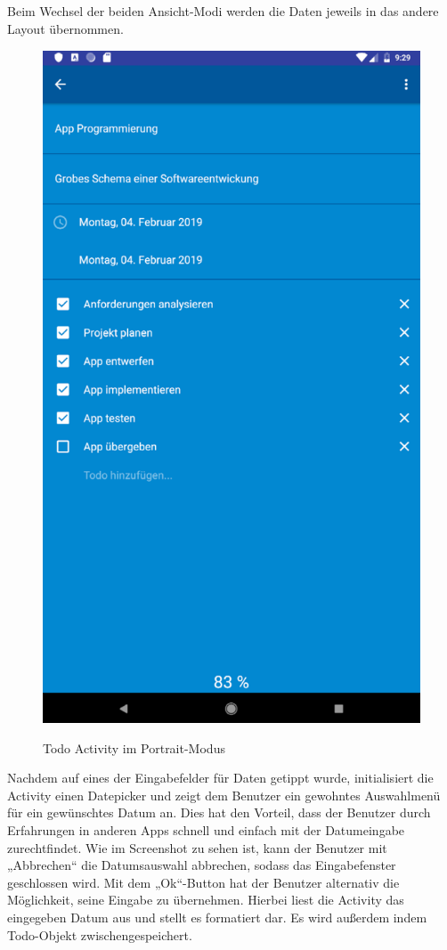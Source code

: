Beim Wechsel der beiden Ansicht-Modi werden die Daten jeweils in das andere Layout übernommen.

\begin{figure}[H]
\centering
\begin{minipage}[t]{1\textwidth} %
\caption{Todo Activity im Portrait-Modus} %
\includegraphics[height=20cm]{img/Todo_portrait}\\ %
\end{minipage}
\end{figure}

Nachdem auf eines der Eingabefelder für Daten getippt wurde, initialisiert die Activity einen Datepicker und zeigt dem Benutzer ein gewohntes Auswahlmenü für ein gewünschtes Datum an. Dies hat den Vorteil, dass der Benutzer durch Erfahrungen in anderen Apps schnell und einfach mit der Datumeingabe zurechtfindet. Wie im Screenshot zu sehen ist, kann der Benutzer mit „Abbrechen“ die Datumsauswahl abbrechen, sodass das Eingabefenster geschlossen wird. Mit dem „Ok“-Button hat der Benutzer alternativ die Möglichkeit, seine Eingabe zu übernehmen. Hierbei liest die Activity das eingegeben Datum aus und stellt es formatiert dar. Es wird außerdem indem Todo-Objekt zwischengespeichert.

